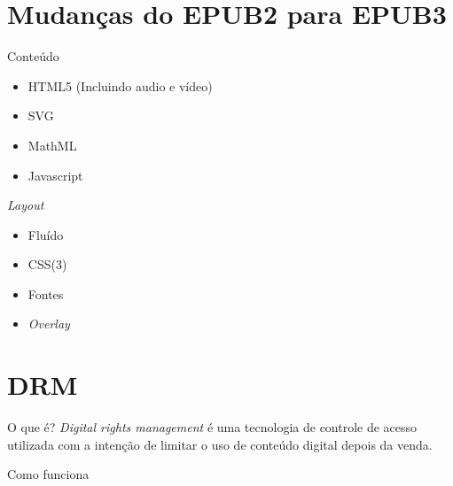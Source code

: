 \documentclass[11pt]{beamer}
\newcommand{\flang}[1]{\textit{#1}}
\begin{document}
\section{Mudanças do EPUB2 para EPUB3}
\nocite{epub3Changes}
\begin{frame}{Conteúdo}
  \begin{itemize}
    \item HTML5 \pause(Incluindo audio e vídeo)
      \pause
    \item SVG
      \pause
    \item MathML
      \pause
    \item Javascript
  \end{itemize}
\end{frame}

\begin{frame}{\flang{Layout}}
  \begin{itemize}
    \item Fluído
      \pause
    \item CSS(3)
      \pause
    \item Fontes
      \pause
    \item \flang{Overlay}
  \end{itemize}
\end{frame}


\section{DRM}
\begin{frame}{O que é?}
  \flang{Digital rights management} é uma tecnologia de controle de acesso
  utilizada com a intenção de limitar o uso de conteúdo digital depois da venda.
\end{frame}

\begin{frame}{Como funciona}
  \begin{center}
    \hspace{.25\textwidth}\pause
  \end{center}
\end{frame}
\end{document}
